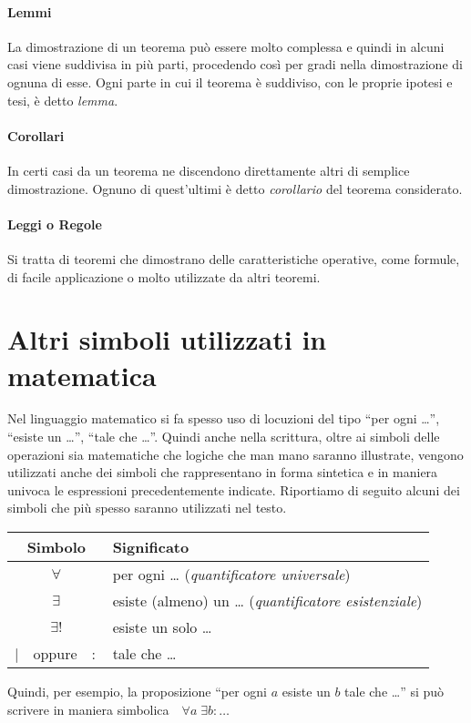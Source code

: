 \paragraph{Lemmi}
La dimostrazione di un teorema può essere molto complessa e quindi in alcuni casi viene suddivisa in più parti, procedendo così per gradi nella dimostrazione di ognuna di esse. Ogni parte in cui il teorema è suddiviso, con le proprie ipotesi e tesi, è detto \emph{lemma}.

\paragraph{Corollari}
In certi casi da un teorema ne discendono direttamente altri di semplice dimostrazione. Ognuno di quest'ultimi è detto \emph{corollario} del teorema considerato.

\paragraph{Leggi o Regole}
Si tratta di teoremi che dimostrano delle caratteristiche operative, come formule, di facile applicazione o molto utilizzate da altri teoremi.


\section{Altri simboli utilizzati in matematica}

Nel linguaggio matematico si fa spesso uso di locuzioni del tipo ``per ogni \ldots'', ``esiste un \ldots'',  ``tale che \ldots''. Quindi anche nella scrittura, oltre ai simboli delle operazioni sia matematiche che logiche che man mano saranno illustrate, vengono utilizzati anche dei simboli che rappresentano in forma sintetica e in maniera univoca le espressioni precedentemente indicate. Riportiamo di seguito alcuni dei simboli che più spesso saranno utilizzati nel testo.

\begin{table}[!hb]
\begin{center}
\begin{tabular}{cl}
\toprule
Simbolo & Significato\\
\midrule
$\forall$ & per ogni \ldots{} (\emph{quantificatore universale}) \\
$\exists$ & esiste (almeno) un \ldots{} (\emph{quantificatore esistenziale}) \\
$\exists!$ & esiste un solo \ldots \\
$|$~~oppure~~$:$ & tale che \ldots \\
\bottomrule
\end{tabular}
\end{center}
\end{table}

Quindi, per esempio, la proposizione ``per ogni $a$ esiste un $b$ tale che \ldots{}'' si può scrivere in maniera simbolica~~$\forall a\;\exists b :\ldots{}$

\cleardoublepage
